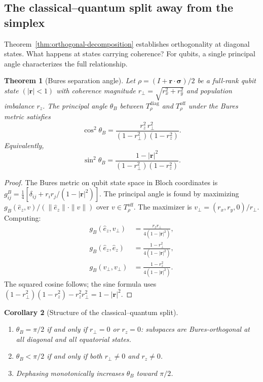 \documentclass[12pt,a4paper]{article}
\newtheorem{theorem}{Theorem}[section]
\newtheorem{corollary}[theorem]{Corollary}
\theoremstyle{definition}
\theoremstyle{remark}
\begin{document}
\subsection{The classical--quantum split away from the simplex}
\label{sec:bures-angle}

Theorem~\ref{thm:orthogonal-decomposition} establishes orthogonality at diagonal states. What happens at states carrying coherence? For qubits, a single principal angle characterizes the full relationship.

\begin{theorem}[Bures separation angle]
\label{thm:bures-angle}
Let $\rho = (I + \mathbf{r} \cdot \boldsymbol{\sigma})/2$ be a full-rank qubit state $(|\mathbf{r}| < 1)$ with coherence magnitude $r_\perp = \sqrt{r_x^2 + r_y^2}$ and population imbalance $r_z$. The principal angle $\theta_B$ between $T_\rho^{\mathrm{diag}}$ and $T_\rho^{\mathrm{off}}$ under the Bures metric satisfies
\begin{equation}
\label{eq:bures-angle}
\cos^2 \theta_B = \frac{r_z^2\, r_\perp^2}{(1 - r_\perp^2)(1 - r_z^2)}.
\end{equation}
Equivalently,
\begin{equation}
\label{eq:bures-angle-sin}
\sin^2 \theta_B = \frac{1 - |\mathbf{r}|^2}{(1 - r_\perp^2)(1 - r_z^2)}.
\end{equation}
\end{theorem}

\begin{proof}
The Bures metric on qubit state space in Bloch coordinates is $g_{ij}^B = \frac{1}{4}[\delta_{ij} + r_i r_j/(1 - |\mathbf{r}|^2)]$. The principal angle is found by maximizing $g_B(\hat{e}_z, v)/(\|\hat{e}_z\| \cdot \|v\|)$ over $v \in T_\rho^{\mathrm{off}}$. The maximizer is $v_\perp = (r_x, r_y, 0)/r_\perp$. Computing:
\begin{align*}
g_B(\hat{e}_z, v_\perp) &= \frac{r_z r_\perp}{4(1 - |\mathbf{r}|^2)}, \\
g_B(\hat{e}_z, \hat{e}_z) &= \frac{1 - r_\perp^2}{4(1 - |\mathbf{r}|^2)}, \\
g_B(v_\perp, v_\perp) &= \frac{1 - r_z^2}{4(1 - |\mathbf{r}|^2)}.
\end{align*}
The squared cosine follows; the sine formula uses $(1 - r_\perp^2)(1 - r_z^2) - r_z^2 r_\perp^2 = 1 - |\mathbf{r}|^2$.
\end{proof}

\begin{corollary}[Structure of the classical--quantum split]
\label{cor:angle-structure}
\quad
\begin{enumerate}
\item[\emph{(i)}] $\theta_B = \pi/2$ if and only if $r_\perp = 0$ or $r_z = 0$: subspaces are Bures-orthogonal at all diagonal and all equatorial states.
\item[\emph{(ii)}] $\theta_B < \pi/2$ if and only if both $r_\perp \neq 0$ and $r_z \neq 0$.
\item[\emph{(iii)}] Dephasing monotonically increases $\theta_B$ toward $\pi/2$.
\end{enumerate}
\end{corollary}
\end{document}
